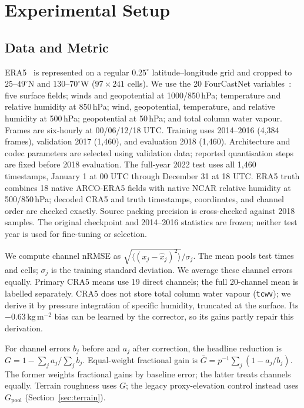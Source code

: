 \section{Experimental Setup}
\label{sec:setup}

\subsection{Data and Metric}
ERA5~\cite{hersbach2020} is represented on a regular $0.25^\circ$
latitude--longitude grid and cropped to $25$--$49^\circ$N and
$130$--$70^\circ$W ($97\times241$ cells). We use the
20 FourCastNet variables~\cite{pathak2022}: five surface fields; winds and
geopotential at 1000/850\,hPa; temperature and relative humidity at 850\,hPa;
wind, geopotential, temperature, and relative humidity at 500\,hPa; geopotential
at 50\,hPa; and total column water vapour. Frames are six-hourly at 00/06/12/18
UTC. Training uses 2014--2016 (4{,}384 frames), validation 2017 (1{,}460), and
evaluation 2018 (1{,}460). Architecture and codec parameters are selected using
validation data; reported quantisation steps are fixed before 2018 evaluation.
The full-year 2022 test uses all 1{,}460 timestamps, January 1 at 00 UTC through
December 31 at 18 UTC. ERA5 truth combines 18 native
ARCO-ERA5 fields with native NCAR relative humidity at 500/850\,hPa; decoded
CRA5 and truth timestamps, coordinates, and channel order are checked exactly.
Source packing precision is cross-checked against 2018 samples. The original
checkpoint and 2014--2016 statistics are frozen; neither test year is used for
fine-tuning or selection.

We compute channel nRMSE as $\sqrt{\langle(x_j-\hat x_j)^2\rangle}/\sigma_j$.
The mean pools test times and cells; $\sigma_j$ is the training standard deviation. We
average these channel errors equally. Primary CRA5 means use 19 direct channels;
the full 20-channel mean is labelled separately. CRA5 does not store total column
water vapour (\texttt{tcwv}); we derive it by pressure integration of specific
humidity, truncated at the surface. Its $-0.63\,\mathrm{kg\,m^{-2}}$ bias can
be learned by the corrector, so its gains partly repair this derivation.

For channel errors $b_j$ before and $a_j$ after correction, the headline reduction
is $G=1-\sum_j a_j/\sum_j b_j$. Equal-weight fractional gain is
$\bar G=p^{-1}\sum_j(1-a_j/b_j)$. The former weights fractional gains by baseline
error; the latter treats channels equally. Terrain roughness uses $G$; the legacy proxy-elevation control instead uses
$G_{\mathrm{pool}}$ (Section~\ref{sec:terrain}).

